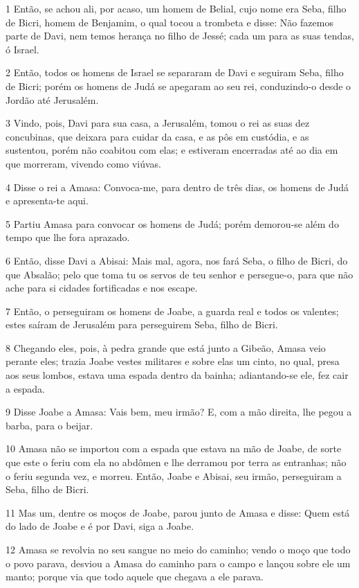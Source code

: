 \par 1 Então, se achou ali, por acaso, um homem de Belial, cujo nome era Seba, filho de Bicri, homem de Benjamim, o qual tocou a trombeta e disse: Não fazemos parte de Davi, nem temos herança no filho de Jessé; cada um para as suas tendas, ó Israel.
\par 2 Então, todos os homens de Israel se separaram de Davi e seguiram Seba, filho de Bicri; porém os homens de Judá se apegaram ao seu rei, conduzindo-o desde o Jordão até Jerusalém.
\par 3 Vindo, pois, Davi para sua casa, a Jerusalém, tomou o rei as suas dez concubinas, que deixara para cuidar da casa, e as pôs em custódia, e as sustentou, porém não coabitou com elas; e estiveram encerradas até ao dia em que morreram, vivendo como viúvas.
\par 4 Disse o rei a Amasa: Convoca-me, para dentro de três dias, os homens de Judá e apresenta-te aqui.
\par 5 Partiu Amasa para convocar os homens de Judá; porém demorou-se além do tempo que lhe fora aprazado.
\par 6 Então, disse Davi a Abisai: Mais mal, agora, nos fará Seba, o filho de Bicri, do que Absalão; pelo que toma tu os servos de teu senhor e persegue-o, para que não ache para si cidades fortificadas e nos escape.
\par 7 Então, o perseguiram os homens de Joabe, a guarda real e todos os valentes; estes saíram de Jerusalém para perseguirem Seba, filho de Bicri.
\par 8 Chegando eles, pois, à pedra grande que está junto a Gibeão, Amasa veio perante eles; trazia Joabe vestes militares e sobre elas um cinto, no qual, presa aos seus lombos, estava uma espada dentro da bainha; adiantando-se ele, fez cair a espada.
\par 9 Disse Joabe a Amasa: Vais bem, meu irmão? E, com a mão direita, lhe pegou a barba, para o beijar.
\par 10 Amasa não se importou com a espada que estava na mão de Joabe, de sorte que este o feriu com ela no abdômen e lhe derramou por terra as entranhas; não o feriu segunda vez, e morreu. Então, Joabe e Abisai, seu irmão, perseguiram a Seba, filho de Bicri.
\par 11 Mas um, dentre os moços de Joabe, parou junto de Amasa e disse: Quem está do lado de Joabe e é por Davi, siga a Joabe.
\par 12 Amasa se revolvia no seu sangue no meio do caminho; vendo o moço que todo o povo parava, desviou a Amasa do caminho para o campo e lançou sobre ele um manto; porque via que todo aquele que chegava a ele parava.
